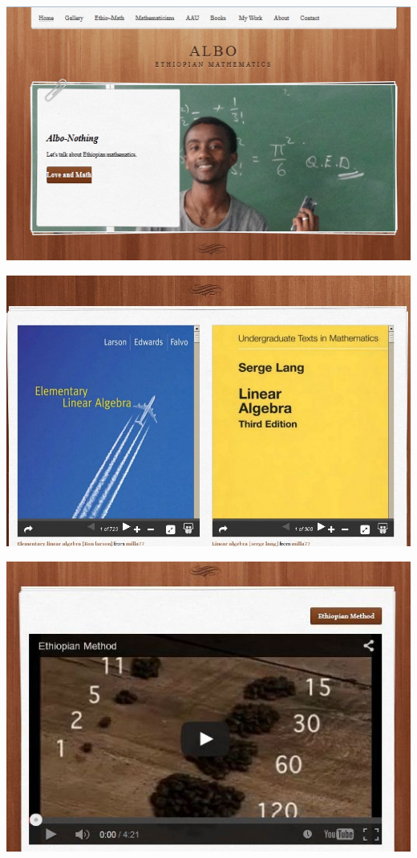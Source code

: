 \documentclass[landscape,a0paper,fontscale=0.285]{baposter} %
\begin{document}
\begin{poster}
{\begin{multicols}{2}
\vspace{1em}
\begin{center}
\includegraphics[width=1.9\linewidth]{placeholder}
\end{center}


\end{multicols}


\begin{multicols}{2}
\vspace{1em}

\begin{center}
\includegraphics[width=0.8\linewidth]{pbook}
\end{center}

\begin{center}
\includegraphics[width=0.7\linewidth]{pplace}
\end{center}


\end{multicols}}
\end{poster}
\end{document}
